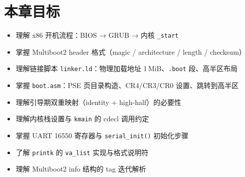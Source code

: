 \section{本章目标}

\begin{itemize}
  \item 理解 x86 开机流程：BIOS → GRUB → 内核 \texttt{\_start}
  \item 掌握 Multiboot2 header 格式（magic / architecture / length / checksum）
  \item 理解链接脚本 \texttt{linker.ld}：物理加载地址 1\,MiB、\texttt{.boot} 段、高半区布局
  \item 掌握 \texttt{boot.asm}：PSE 页目录构造、CR4/CR3/CR0 设置、跳转到高半区
  \item 理解引导期双重映射（identity + high-half）的必要性
  \item 理解内核栈设置与 \texttt{kmain} 的 cdecl 调用约定
  \item 掌握 UART 16550 寄存器与 \texttt{serial\_init()} 初始化步骤
  \item 了解 \texttt{printk} 的 \texttt{va\_list} 实现与格式说明符
  \item 理解 Multiboot2 info 结构的 tag 迭代解析
\end{itemize}


